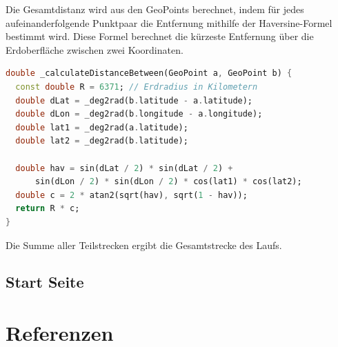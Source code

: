 \documentclass[11pt,a4paper]{article}
\begin{document}
Die Gesamtdistanz wird aus den GeoPoints berechnet, indem für jedes aufeinanderfolgende Punktpaar die Entfernung mithilfe der Haversine-Formel bestimmt wird. Diese Formel berechnet die kürzeste Entfernung über die Erdoberfläche zwischen zwei Koordinaten.

\begin{lstlisting}[language=Dart, caption=Berechnung der Entfernung zweier GeoPoints]
double _calculateDistanceBetween(GeoPoint a, GeoPoint b) {
  const double R = 6371; // Erdradius in Kilometern
  double dLat = _deg2rad(b.latitude - a.latitude);
  double dLon = _deg2rad(b.longitude - a.longitude);
  double lat1 = _deg2rad(a.latitude);
  double lat2 = _deg2rad(b.latitude);

  double hav = sin(dLat / 2) * sin(dLat / 2) +
      sin(dLon / 2) * sin(dLon / 2) * cos(lat1) * cos(lat2);
  double c = 2 * atan2(sqrt(hav), sqrt(1 - hav));
  return R * c;
}
\end{lstlisting}

Die Summe aller Teilstrecken ergibt die Gesamtstrecke des Laufs.

\subsection{Start Seite}

\newpage
\section{Referenzen}
\end{document}
